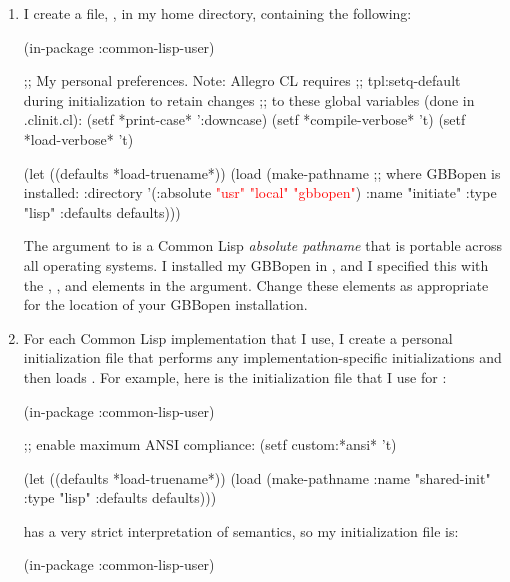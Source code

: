 \documentclass[10pt,twoside,english,pdftex]{article}
\begin{document}
\begin{enumerate}

\item I create a file, , in my home directory,
  containing the following:
%
\W\supp\notpretop
\begin{example}
  (in-package :common-lisp-user)

  ;; My personal preferences.  Note: Allegro CL requires 
  ;; tpl:setq-default during initialization to retain changes
  ;; to these global variables (done in .clinit.cl):
  (setf *print-case* ':downcase)
  (setf *compile-verbose* 't)
  (setf *load-verbose* 't)

  (let ((defaults *load-truename*))
    (load (make-pathname 
            ;; where GBBopen is installed:
            :directory '(:absolute \textcolor{red}{"usr" "local" "gbbopen"})
            :name "initiate"
            :type "lisp"
            :defaults defaults)))
\end{example}

The  argument to  is a Common Lisp
\textit{absolute pathname} that is portable across all operating systems.  I
installed my GBBopen in , and I specified
this with the , , and  elements in
the  argument.  Change these elements as appropriate for the
location of your GBBopen installation.

\item For each Common Lisp implementation that I use, I create a personal
  initialization file that performs any implementation-specific
  initializations and then loads .  For example,
  here is the  initialization file that I use for
  :
%
\W\supp\notpretop
\begin{example}
  (in-package :common-lisp-user)

  ;; enable maximum ANSI compliance:
  (setf custom:*ansi* 't)

  (let ((defaults *load-truename*))
    (load (make-pathname 
            :name "shared-init"
            :type "lisp"
            :defaults defaults)))
\end{example}

 has a very strict interpretation
of  semantics, so my 
initialization file is:
%
\W\supp
\begin{example}
  (in-package :common-lisp-user)


\end{example}
\end{enumerate}
\end{document}
